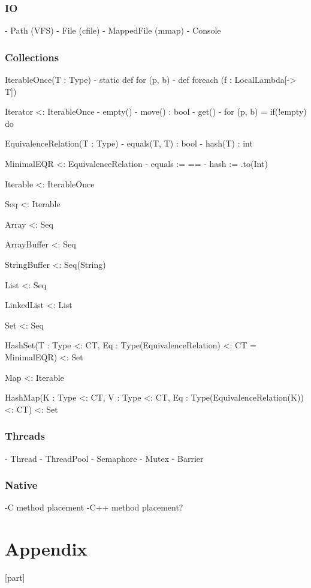 \documentclass[a4paper,10pt]{article}
\begin{document}
\section{IO}

 - Path (VFS)
 - File (cfile)
 - MappedFile (mmap)
 - Console


\section{Collections}

IterableOnce(T : Type)
- static def for (p, b)
- def foreach (f : LocalLambda[-> T])

Iterator <: IterableOnce
- empty()
- move() : bool
- get()
- for (p, b) = if(!empty) do {}

EquivalenceRelation(T : Type)
- equals(T, T) : bool
- hash(T) : int

MinimalEQR <: EquivalenceRelation
- equals := ==
- hash := .to(Int)

Iterable <: IterableOnce

Seq <: Iterable

Array <: Seq

ArrayBuffer <: Seq

StringBuffer <: Seq(String)

List <: Seq

LinkedList <: List

Set <: Seq

HashSet(T : Type <: CT, Eq : Type(EquivalenceRelation) <: CT = MinimalEQR) <: Set

Map <: Iterable

HashMap(K : Type <: CT, V : Type <: CT, Eq : Type(EquivalenceRelation(K)) <: CT) <: Set

\section{Threads}

- Thread
- ThreadPool
- Semaphore
- Mutex
- Barrier

\section{Native}

-C method placement
-C++ method placement?



\newpage
\part{Appendix}
[part]
\renewcommand{\thesection}{\Alph{myc}}
\let\osection\section
\renewenvironment{section}{\stepcounter{myc}\osection}

\newpage
\printglossaries

\small{
    
    
}

\todos
\end{document}
